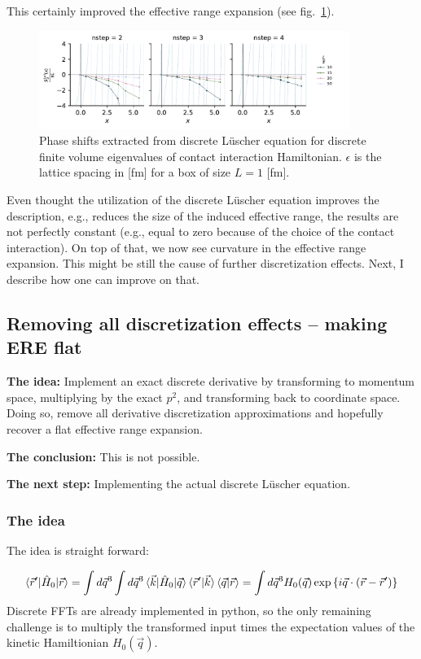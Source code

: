 \documentclass[
    aps,
    prl,
    showkeys,
    nofootinbib,
    floatfix
]{revtex4-1}
\begin{document}
This certainly improved the effective range expansion (see fig.~\ref{fig-cont-lusch}).
\begin{figure}[!htb]
\includegraphics[width=0.9\textwidth]{figs/eff-range-discrete-lusch.pdf}
\caption{
    \label{fig-cont-lusch}Phase shifts extracted from discrete Lüscher equation for discrete finite volume eigenvalues of contact interaction Hamiltonian.
    $\epsilon$ is the lattice spacing in [fm] for a box of size $L = 1$ [fm].
 }
\end{figure}

Even thought the utilization of the discrete Lüscher equation improves the description, e.g., reduces the size of the induced effective range, the results are not perfectly constant (e.g., equal to zero because of the choice of the contact interaction).
On top of that, we now see curvature in the effective range expansion.
This might be still the cause of further discretization effects.
Next, I describe how one can improve on that.

\subsection{Removing all discretization effects -- making ERE flat}
\textbf{The idea:} Implement an exact discrete derivative by transforming to momentum space, multiplying by the exact $p^2$, and transforming back to coordinate space.
Doing so, remove all derivative discretization approximations and hopefully recover a flat effective range expansion.

\textbf{The conclusion:} This is not possible.

\textbf{The next step:} Implementing the actual discrete Lüscher equation.

\subsubsection{The idea}
The idea is straight forward:

\begin{equation}
	\braket{ \vec r ' | \hat H_0 | \vec r}
	=
	\int d \vec q^3 \int d \vec q^3 \braket{ \vec k | \hat H_0 | \vec q} \braket{\vec r' | \vec k} \braket{\vec q | \vec r}
	=
	\int d \vec q^3 H_0(\vec q) \exp\left\{ i \vec q \cdot \left( \vec r - \vec r '\right)\right\}
\end{equation}
Discrete FFTs are already implemented in python, so the only remaining challenge is to multiply the transformed input times the expectation values of the kinetic Hamiltionian $H_0(\vec q)$.
\end{document}
